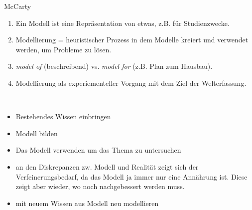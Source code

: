 \begin{frame}[allowframebreaks]{McCarty}

\begin{enumerate}
    \item Ein Modell ist eine Repräsentation von etwas, z.B. für Studienzwecke.
    \item Modellierung = heuristischer Prozess in dem Modelle kreiert und verwendet werden, um Probleme zu lösen.
    \item \emph{model of} (beschreibend) vs. \emph{model for} (z.B. Plan zum Hausbau).
    \item Modellierung als experiementeller Vorgang mit dem Ziel der Welterfassung.
\end{enumerate}
\framebreak

 \\
\begin{itemize}
    \item Bestehendes Wissen einbringen
    \item Modell bilden
    \item Das Modell verwenden um das Thema zu untersuchen
    \item an den Diskrepanzen zw. Modell und Realität zeigt sich der Verfeinerungsbedarf, da das Modell ja immer nur eine Annährung ist. Diese zeigt aber wieder, wo noch nachgebessert werden muss. 
    \item mit neuem Wissen aus Modell neu modellieren
\end{itemize}

\end{frame}

